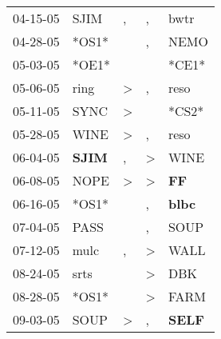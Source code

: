 \begin{supertabular}{p{0.07\textwidth}p{0.06\textwidth}p{0.02\textwidth}p{0.02\textwidth}p{0.06\textwidth}}
          04-15-05\textsuperscript{} &           SJIM\textsuperscript{} &                , &                , &           bwtr\textsuperscript{} \\
          04-28-05\textsuperscript{} &                            *OS1* &                  &                , &           NEMO\textsuperscript{} \\
          05-03-05\textsuperscript{} &                            *OE1* &                  &                  &                            *CE1* \\
          05-06-05\textsuperscript{} &           ring\textsuperscript{} &     \textgreater &                , &           reso\textsuperscript{} \\
          05-11-05\textsuperscript{} &           SYNC\textsuperscript{} &     \textgreater &                  &                            *CS2* \\
          05-28-05\textsuperscript{} &           WINE\textsuperscript{} &     \textgreater &                , &           reso\textsuperscript{} \\
          06-04-05\textsuperscript{} &  \textbf{SJIM\textsuperscript{}} &                , &     \textgreater &           WINE\textsuperscript{} \\
          06-08-05\textsuperscript{} &           NOPE\textsuperscript{} &     \textgreater &     \textgreater &    \textbf{FF\textsuperscript{}} \\
          06-16-05\textsuperscript{} &                            *OS1* &                  &                , &  \textbf{blbc\textsuperscript{}} \\
          07-04-05\textsuperscript{} &           PASS\textsuperscript{} &                  &                , &           SOUP\textsuperscript{} \\
          07-12-05\textsuperscript{} &           mulc\textsuperscript{} &                , &     \textgreater &           WALL\textsuperscript{} \\
          08-24-05\textsuperscript{} &           srts\textsuperscript{} &                  &     \textgreater &            DBK\textsuperscript{} \\
          08-28-05\textsuperscript{} &                            *OS1* &                  &     \textgreater &           FARM\textsuperscript{} \\
          09-03-05\textsuperscript{} &           SOUP\textsuperscript{} &     \textgreater &                , &  \textbf{SELF\textsuperscript{}} \\

\end{supertabular}
